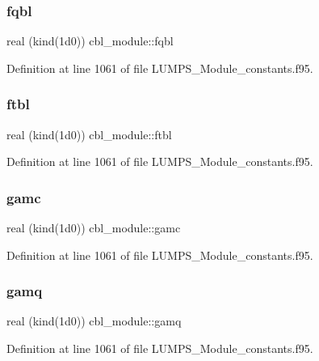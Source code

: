 \subsubsection{\texorpdfstring{fqbl}{fqbl}}
{\footnotesize\ttfamily real (kind(1d0)) cbl\+\_\+module\+::fqbl}



Definition at line 1061 of file L\+U\+M\+P\+S\+\_\+\+Module\+\_\+constants.\+f95.

\mbox{\label{namespacecbl__module_a9096ed1c586fe2526affe44bdc6a3506}} 
\subsubsection{\texorpdfstring{ftbl}{ftbl}}
{\footnotesize\ttfamily real (kind(1d0)) cbl\+\_\+module\+::ftbl}



Definition at line 1061 of file L\+U\+M\+P\+S\+\_\+\+Module\+\_\+constants.\+f95.

\mbox{\label{namespacecbl__module_a999c82d729d623cf9e734d5b8f60413b}} 
\subsubsection{\texorpdfstring{gamc}{gamc}}
{\footnotesize\ttfamily real (kind(1d0)) cbl\+\_\+module\+::gamc}



Definition at line 1061 of file L\+U\+M\+P\+S\+\_\+\+Module\+\_\+constants.\+f95.

\mbox{\label{namespacecbl__module_a2f0b130ab9a329454293c11707b4f89f}} 
\subsubsection{\texorpdfstring{gamq}{gamq}}
{\footnotesize\ttfamily real (kind(1d0)) cbl\+\_\+module\+::gamq}



Definition at line 1061 of file L\+U\+M\+P\+S\+\_\+\+Module\+\_\+constants.\+f95.

